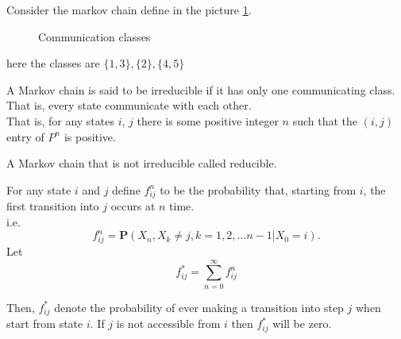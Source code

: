 \begin{example}[]
    Consider the markov chain define in the picture \cref{example of communication}.
\begin{figure}[h]
    \centering
    \caption{Communication classes}
    \label{example of communication}
\end{figure}

here the classes are $\{ 1,3 \}, \{2\}, \{4,5\}$
\end{example}

\begin{definition}
    A Markov chain is said to be irreducible if it has only one communicating class. That is, every state communicate with each other.\\ 
    That is, for any states $i$, $j$ there is some positive integer $n$ such that the $(i, j)$ entry of $ P^{n} $ is positive.
\end{definition}

A Markov chain that is not irreducible called reducible.

For any state $ i $ and $ j $ define $ f^{n}_{ij} $ to be the probability that, starting from $ i $, the first transition into $ j  $
occurs at $ n $ time. \\ 
i.e. 
\[
    f^{n}_{ij} = \mathbf{P}(X_{n},X_{k}\neq j, k=1,2,\ldots n-1|X_{0}=i).
\]
Let
\[
    f^*_{ij}=\sum_{n=0}^{\infty} f^{n}_{ij}
\]

Then, $ f^*_{ij} $ denote the probability of ever making a transition into step $ j $ when start from state $ i $. 
If $ j $ is not accessible from $ i $ then $ f^*_{ij} $ will be zero.

